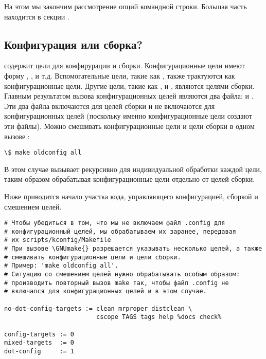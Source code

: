 На этом мы закончим рассмотрение опций командной строки. Большая часть
 находится в секции .

\subsection{Конфигурация или сборка?}
\Makefile{} содержит цели для конфирурации и сборки. Конфигурационные
цели имеют форму , , и
т.д. Вспомогательные цели, такие как , также трактуются
как конфигурационные цели. Другие цели, такие как ,
 и , являются целями сборки. Главным
результатом вызова конфигурационных целей являются два файла:
 и . Эти два файла включаются
 для целей сборки и не включаются для конфигурационных
целей (поскольку именно конфигурационные цели создают эти
файлы). Можно смешивать конфигурационные цели и цели сборки в одном
вызове \GNUmake{}:

\begin{verbatim}
\$ make oldconfig all
\end{verbatim}

В этом случае \Makefile{} вызывает \GNUmake{} рекурсивно для
индивидуальной обработки каждой цели, таким образом обрабатывая
конфигурационные цели отдельно от целей сборки.

Ниже приводится начало участка кода, управляющего конфигурацией,
сборкой и смешением целей.

\begin{verbatim}
# Чтобы убедиться в том, что мы не включаем файл .config для
# конфигурационный целей, мы обрабатываем их заранее, передавая
# их scripts/kconfig/Makefile
# При вызове \GNUmake{} разрешается указывать несколько целей, а также
# смешивать конфигурационные цели и цели сборки.
# Пример: 'make oldconfig all'.
# Ситуацию со смешением целей нужно обрабатывать особым образом:
# производить повторный вызов make так, чтобы файл .config не
# включался для конфигурационных целей и в этом случае.

no-dot-config-targets := clean mrproper distclean \
                         cscope TAGS tags help %docs check%

config-targets := 0
mixed-targets  := 0
dot-config     := 1
\end{verbatim}

